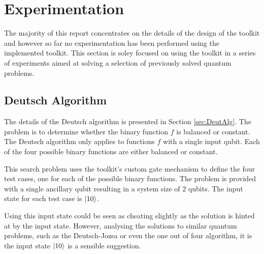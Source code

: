\chapter{Experimentation}
\label{sec:experimentation}

The majority of this report concentrates on the details of the design of the toolkit and however so far no experimentation has been performed using the implemented toolkit.
This section is soley focused on using the toolkit in a series of experiments aimed at solving a selection of previously solved quantum problems.

\section{Deutsch Algorithm}
\label{sec:deutschexperiment}
The details of the Deutsch algorithm is presented in Section \ref{sec:DeutAlg}.
The problem is to determine whether the binary function $f$ is balanced or constant.
The Deutsch algorithm only applies to functions $f$ with a single input qubit.
Each of the four possible binary functions are either balanced or constant.

This search problem uses the toolkit's custom gate mechanism to define the four test cases, one for each of the possible binary functions.
The problem is provided with a single ancillary qubit resulting in a system size of $2$ qubits.
The input state for each test case is $\left\vert{10}\right\rangle$.

Using this input state could be seen as cheating slightly as the solution is hinted at by the input state.
However, analysing the solutions to similar quantum problems, such as the Deutsch-Jozsa or even the one out of four algorithm, it is the input state $\left\vert{10}\right\rangle$ is a sensible suggestion.

